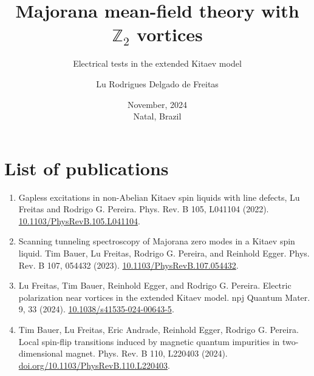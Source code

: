 


\date{November, 2024 \\ Natal, Brazil}
\author{Lu Rodrigues Delgado de Freitas}
\title{Majorana mean-field theory with {$\mathbb{Z}_2$} vortices}
\subtitle{Electrical tests in the extended Kitaev model}


\maketitle
\setcounter{secnumdepth}{2}


\tableofcontents
\setcounter{secnumdepth}{3}
\frontmatter


\chapter*{List of publications}\begin{enumerate}
    \item Gapless excitations in non-Abelian Kitaev spin liquids with line defects, Lu Freitas and Rodrigo G. Pereira.  Phys. Rev. B 105, L041104 (2022). \href{https://doi.org/10.1103/PhysRevB.105.L041104}{10.1103/PhysRevB.105.L041104}.
    \item Scanning tunneling spectroscopy of Majorana zero modes in a Kitaev spin liquid. Tim Bauer, Lu Freitas, Rodrigo G. Pereira, and Reinhold Egger. Phys. Rev. B 107, 054432 (2023). \href{https://doi.org/10.1103/PhysRevB.107.054432}{10.1103/PhysRevB.107.054432}.
    \item Lu Freitas, Tim Bauer, Reinhold Egger, and Rodrigo G. Pereira. Electric polarization near vortices in the extended Kitaev model.  npj Quantum Mater. 9, 33 (2024).  \href{https://doi.org/10.1038/s41535-024-00643-5}{10.1038/s41535-024-00643-5}.
    \item Tim Bauer, Lu Freitas, Eric Andrade, Reinhold Egger, Rodrigo G. Pereira. Local spin-flip transitions induced by magnetic quantum impurities in two-dimensional magnet. Phys. Rev. B 110, L220403 (2024).
    \href{https://doi.org/10.1103/PhysRevB.110.L220403}{doi.org/10.1103/PhysRevB.110.L220403}.
\end{enumerate}
\listoffigures
\listoftables
\mainmatter

